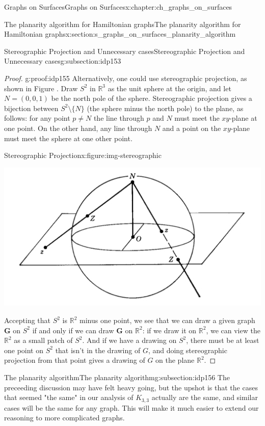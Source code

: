 \documentclass[oneside,10pt,]{book}
\numberwithin{equation}{section}
\newcommand{\reals}{\mathbb{R}}
\newcommand{\bfG}{\mathbf{G}}
\begin{document}
\begin{chapterptx}{Graphs on Surfaces}{}{Graphs on Surfaces}{}{}{x:chapter:ch_graphs_on_surfaces}
\begin{sectionptx}{The planarity algorithm for Hamiltonian graphs}{}{The planarity algorithm for Hamiltonian graphs}{}{}{x:section:s_graphs_on_surfaces_planarity_algorithm}
\begin{subsectionptx}{Stereographic Projection and Unnecessary cases}{}{Stereographic Projection and Unnecessary cases}{}{}{g:subsection:idp153}
\begin{proof}{}{g:proof:idp155}
Alternatively, one could use stereographic projection, as shown in Figure .  Draw \(S^2\) in \(\reals^3\) as the unit sphere at the origin, and let \(N=(0,0,1)\) be the north pole of the sphere.  Stereographic projection gives a bijection between \(S^2\setminus\{N\}\) (the sphere minus the north pole) to the plane, as follows: for any point \(p\neq N\) the line through \(p\) and \(N\) must meet the \(xy\)-plane at one point.  On the other hand, any line through \(N\) and a point on the \(xy\)-plane must meet the sphere at one other point.%
\begin{figureptx}{Stereographic Projection}{x:figure:img-stereographic}{}%
\begin{image}{0.05}{0.9}{0.05}%
\includegraphics[width=\linewidth]{images/stereographic.jpg}
\end{image}%
\tcblower
\end{figureptx}%
Accepting that \(S^2\) is \(\reals^2\) minus one point, we see that we can draw a given graph \(\bfG\) on \(S^2\) if and only if we can draw \(\bfG\) on \(\reals^2\): if we draw it on \(\reals^2\), we can view the \(\reals^2\) as a small patch of \(S^2\). And if we have a drawing on \(S^2\), there must be at least one point on \(S^2\) that isn't in the drawing of \(G\), and doing stereographic projection from that point gives a drawing of \(G\) on the plane \(\reals^2\).%
\end{proof}
\end{subsectionptx}
%
%
\typeout{************************************************}
\typeout{************************************************}
%
\begin{subsectionptx}{The planarity algorithm}{}{The planarity algorithm}{}{}{g:subsection:idp156}
The preceeding discussion may have felt heavy going, but the upshot is that the cases that seemed "the same" in our analysis of \(K_{3,3}\) actually are the same, and similar cases will be the same for any graph. This will make it much easier to extend our reasoning to more complicated graphs.%

\end{subsectionptx}
\end{sectionptx}
\end{chapterptx}
\end{document}

